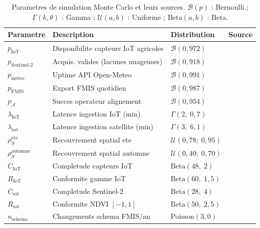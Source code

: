 \documentclass[12pt,a4paper]{article}
\theoremstyle{plain}
\theoremstyle{definition}
\theoremstyle{remark}
\begin{document}
	\begin{table}[H]
		\caption{Parametres de simulation Monte Carlo et leurs sources.
			$\mathcal{B}(p)$ : Bernoulli ; $\Gamma(k,\theta)$ : Gamma ;
			$\mathcal{U}(a,b)$ : Uniforme ; $\text{Beta}(a,b)$ : Beta.}
		\label{tab:sim_params}
		\centering\small
		\renewcommand{\arraystretch}{1.32}
		\begin{tabularx}{\linewidth}{lXll}
			\toprule
			\textbf{Parametre} & \textbf{Description} &
			\textbf{Distribution} & \textbf{Source} \\
			\midrule
			\rowcolor{lightblue!30}
			$p_{\text{IoT}}$ & Disponibilite capteurs IoT agricoles
			& $\mathcal{B}(0{,}972)$ & \cite{iot_review_2025} \\
			$p_{\text{Sentinel-2}}$ & Acquis. valides (lacunes nuageuses)
			& $\mathcal{B}(0{,}918)$ & \cite{sentinel2_ard_2022} \\
			\rowcolor{lightblue!30}
			$p_{\text{meteo}}$ & Uptime API Open-Meteo
			& $\mathcal{B}(0{,}991)$ & \cite{openmeteo_uptime} \\
			$p_{\text{FMIS}}$ & Export FMIS quotidien
			& $\mathcal{B}(0{,}987)$ & \cite{pipeline_survey_2024} \\
			\rowcolor{lightblue!30}
			$p_{\mathcal{A}}$ & Succes operateur alignement
			& $\mathcal{B}(0{,}954)$ & \cite{pipeline_survey_2024} \\
			$\lambda_{\text{IoT}}$ & Latence ingestion IoT (min)
			& $\Gamma(2,\;0{,}7)$ & \cite{iot_agronomy_2023} \\
			\rowcolor{lightblue!30}
			$\lambda_{\text{sat}}$ & Latence ingestion satellite (min)
			& $\Gamma(3,\;6{,}1)$ & \cite{sentinel2_ard_2022} \\
			$\rho_S^{\text{ete}}$ & Recouvrement spatial ete
			& $\mathcal{U}(0{,}78;\;0{,}95)$ & \cite{sentinel2_ard_2022} \\
			\rowcolor{lightblue!30}
			$\rho_S^{\text{automne}}$ & Recouvrement spatial automne
			& $\mathcal{U}(0{,}40;\;0{,}70)$ & \cite{sentinel2_ard_2022} \\
			$C_{\text{IoT}}$ & Completude capteurs IoT
			& $\text{Beta}(48,\;2)$ & \cite{iot_review_2025} \\
			\rowcolor{lightblue!30}
			$R_{\text{IoT}}$ & Conformite gamme IoT
			& $\text{Beta}(60,\;1{,}5)$ & \cite{iot_frontiers_2025} \\
			$C_{\text{sat}}$ & Completude Sentinel-2
			& $\text{Beta}(28,\;4)$ & \cite{ndvi_sentinel2_2023} \\
			\rowcolor{lightblue!30}
			$R_{\text{sat}}$ & Conformite NDVI $[-1,1]$
			& $\text{Beta}(50,\;2{,}5)$ & \cite{sentinel2_ard_2022} \\
			$n_{\text{schema}}$ & Changements schema FMIS/an
			& $\text{Poisson}(3{,}0)$ & \cite{pipeline_survey_2024} \\
			\bottomrule
		\end{tabularx}
	\end{table}
	
\end{document}
